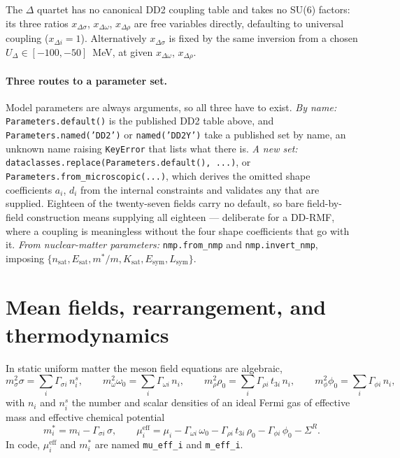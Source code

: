 \documentclass[aps,prc,onecolumn,superscriptaddress,nofootinbib,10pt]{revtex4-2}
\newcommand{\SigR}{\Sigma^{R}}
\newcommand{\mueff}[1]{\mu^{\mathrm{eff}}_{#1}}
\newcommand{\meff}[1]{m^{*}_{#1}}
\begin{document}
The $\Delta$ quartet has no canonical DD2 coupling table and takes no SU(6)
factors: its three ratios $x_{\Delta\sigma}$, $x_{\Delta\omega}$,
$x_{\Delta\rho}$ are free variables directly, defaulting to universal coupling
($x_{\Delta i} = 1$). Alternatively $x_{\Delta\sigma}$ is fixed by the same
inversion from a chosen $U_\Delta \in [-100, -50]$~MeV, at given
$x_{\Delta\omega}$, $x_{\Delta\rho}$.

\paragraph{Three routes to a parameter set.} Model parameters are always
arguments, so all three have to exist. \emph{By name:}
\texttt{Parameters.default()} is the published DD2 table above, and
\texttt{Parameters.named('DD2')} or \texttt{named('DD2Y')} take a published set
by name, an unknown name raising \texttt{KeyError} that lists what there is.
\emph{A new set:} \texttt{dataclasses.replace(Parameters.default(), ...)}, or
\texttt{Parameters.from\_microscopic(...)}, which derives the omitted shape
coefficients $a_i$, $d_i$ from the internal constraints and validates any that
are supplied. Eighteen of the twenty-seven fields carry no default, so bare
field-by-field construction means supplying all eighteen --- deliberate for a
DD-RMF, where a coupling is meaningless without the four shape coefficients
that go with it. \emph{From nuclear-matter parameters:}
\texttt{nmp.from\_nmp} and \texttt{nmp.invert\_nmp}, imposing
$\{n_\mathrm{sat}, E_\mathrm{sat}, m^*/m, K_\mathrm{sat}, E_\mathrm{sym},
L_\mathrm{sym}\}$.

\section{Mean fields, rearrangement, and thermodynamics}

In static uniform matter the meson field equations are algebraic,
%
\begin{equation}
m_\sigma^2 \sigma = \sum_i \Gamma_{\sigma i}\, n^s_i, \qquad
m_\omega^2 \omega_0 = \sum_i \Gamma_{\omega i}\, n_i, \qquad
m_\rho^2 \rho_0 = \sum_i \Gamma_{\rho i}\, t_{3i}\, n_i, \qquad
m_\phi^2 \phi_0 = \sum_i \Gamma_{\phi i}\, n_i ,
\label{eq:fieldeqs}
\end{equation}
%
with $n_i$ and $n^s_i$ the number and scalar densities of an ideal Fermi gas
of effective mass and effective chemical potential
%
\begin{equation}
\meff{i} = m_i - \Gamma_{\sigma i}\, \sigma, \qquad
\mueff{i} = \mu_i - \Gamma_{\omega i}\, \omega_0
          - \Gamma_{\rho i}\, t_{3i}\, \rho_0
          - \Gamma_{\phi i}\, \phi_0 - \SigR .
\label{eq:mueff}
\end{equation}
%
In code, $\mueff{i}$ and $\meff{i}$ are named \texttt{mu\_eff\_i} and
\texttt{m\_eff\_i}.
\end{document}
